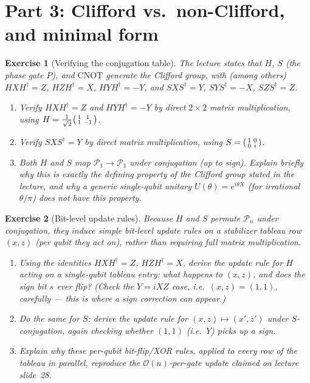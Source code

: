 \documentclass[11pt]{article}
\newtheorem*{exercise}{Exercise}
\newcommand{\Pn}{\mathcal{P}_n}
\begin{document}
\bigskip
\section*{Part 3: Clifford vs.\ non-Clifford, and minimal form}

\begin{exercise}[Verifying the conjugation table]
The lecture states that $H$, $S$ (the phase gate $P$), and $\mathrm{CNOT}$
generate the Clifford group, with (among others) $HXH^\dagger = Z$,
$HZH^\dagger = X$, $HYH^\dagger = -Y$, and $SXS^\dagger = Y$,
$SYS^\dagger = -X$, $SZS^\dagger = Z$.
\begin{enumerate}[label=(\alph*)]
    \item Verify $HXH^\dagger = Z$ and $HYH^\dagger = -Y$ by direct $2\times
    2$ matrix multiplication, using $H = \tfrac{1}{\sqrt2}
    \begin{psmallmatrix}1&1\\1&-1\end{psmallmatrix}$.
    \item Verify $SXS^\dagger = Y$ by direct matrix multiplication, using
    $S = \begin{psmallmatrix}1&0\\0&i\end{psmallmatrix}$.
    \item Both $H$ and $S$ map $\mathcal{P}_1 \to \mathcal{P}_1$ under
    conjugation (up to sign). Explain briefly why this is exactly the
    defining property of the Clifford group stated in the lecture, and why
    a generic single-qubit unitary $U(\theta) = e^{i\theta X}$ (for
    irrational $\theta/\pi$) does \emph{not} have this property.
\end{enumerate}
\end{exercise}

\begin{exercise}[Bit-level update rules]
Because $H$ and $S$ permute $\Pn$ under conjugation, they induce simple
\emph{bit-level} update rules on a stabilizer tableau row $(x,z)$ (per
qubit they act on), rather than requiring full matrix multiplication.
\begin{enumerate}[label=(\alph*)]
    \item Using the identities $HXH^\dagger=Z$, $HZH^\dagger=X$, derive the
    update rule for $H$ acting on a single-qubit tableau entry: what
    happens to $(x,z)$, and does the sign bit $s$ ever flip? (Check the
    $Y=iXZ$ case, i.e.\ $(x,z)=(1,1)$, carefully --- this is where a sign
    correction can appear.)
    \item Do the same for $S$: derive the update rule for $(x,z) \mapsto
    (x',z')$ under $S$-conjugation, again checking whether $(1,1)$
    (i.e.\ $Y$) picks up a sign.
    \item Explain why these per-qubit bit-flip/XOR rules, applied to every
    row of the tableau in parallel, reproduce the $\mathcal{O}(n)$-per-gate
    update claimed on lecture slide~28.
\end{enumerate}
\end{exercise}
\end{document}
